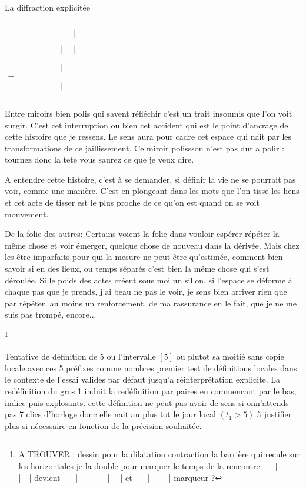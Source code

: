 \documentclass{article}
\begin{document}
La diffraction explicitée

${\scriptscriptstyle\begin{matrix}
  & - & - & - & - &   \\
| &   &   &   &   & | \\
  &   &   &   &   &   \\
| &   |&   &   & | & | \\
  &   &   &   &   & - \\
| &  | &   &   & | &  \\
- &   &   &   &   &   \\
  & | &   &   &  | &   \\
  &   &   &   &   &   \\
\end{matrix}}
$



Entre miroirs bien polis qui savent réfléchir c'est un  trait insoumis que l'on voit surgir. C'est cet interruption ou bien cet accident 
qui est le point d'ancrage de cette histoire que je ressens. Le sens aura pour cadre cet espace qui nait par les transformations de ce jaillissement.
Ce miroir polissson n'est pas dur a polir : tournez donc la tete vous saurez ce que je veux dire. 

 
A entendre cette histoire, c'est à se demander,  si  définir la vie ne se  pourrait pas  voir,  comme une manière.
C'est en  plongeant dans les mots que l'on tisse les liens et cet acte de tisser est le plus proche de ce qu'on est quand on se voit mouvement.

De la folie des autres: Certains voient la folie dans vouloir espérer  répéter la même chose et voir émerger, quelque chose de nouveau dans la dérivée.
Mais chez  les être imparfaits  pour qui  la mesure ne peut être qu'estimée, comment bien savoir si en des lieux, ou temps  séparés c'est bien la même chose qui s'est déroulée. Si le poids des actes créent sous moi un sillon, si l'espace se déforme à chaque pas que je prends, j'ai beau ne pas le voir, je sens bien arriver rien que par répéter, au moins un  renforcement, de  ma rassurance en le fait, que je ne me suis pas  trompé, encore... 


\footnote{A TROUVER  : dessin pour la dilatation contraction la barrière qui recule sur les horizontales je la double pour marquer le temps de la rencontre 
- -- | -  - -  |-  -| devient - -- | -  - -  |-  -|| - |  et - -- | -  - -  | marqueur ? }

 

Tentative de définition de 5 ou l'intervalle $[5]$ ou plutot sa moitié sans copie locale avec ces 5 préfixes comme nombres premier test de définitions locales dans le contexte de l'essai valides par défaut jusqu'a réinterprétation explicite. La redéfinition du gros 1 induit la redéfinition par paires en commencant par le bas, indice puis explosants.
cette définition ne peut pas avoir de sens si onn'attends pas 7 clics d'horloge donc elle nait au plus tot le jour local $(t_1 > 5)$ à justifier plus si nécessaire en fonction de la précision souhaitée. 
\end{document}
